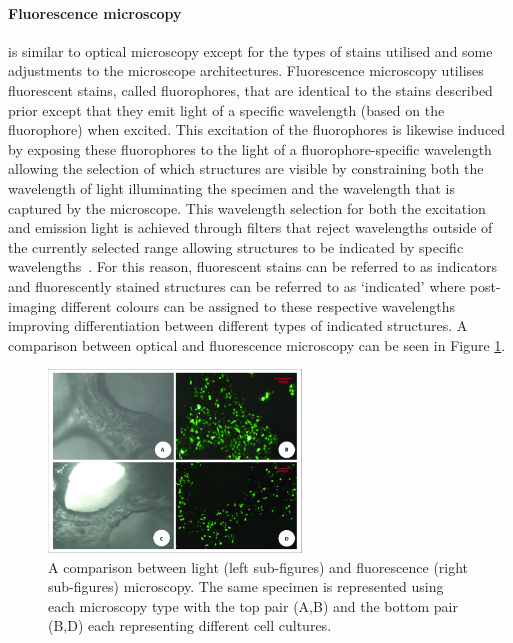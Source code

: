 \paragraph{Fluorescence microscopy} is similar to optical microscopy except for the types of stains utilised and some adjustments to the microscope architectures. Fluorescence microscopy utilises fluorescent stains, called fluorophores, that are identical to the stains described prior except that they emit light of a specific wavelength (based on the fluorophore) when excited. This excitation of the fluorophores is likewise induced by exposing these fluorophores to the light of a fluorophore-specific wavelength allowing the selection of which structures are visible by constraining both the wavelength of light illuminating the specimen and the wavelength that is captured by the microscope. This wavelength selection for both the excitation and emission light is achieved through filters that reject wavelengths outside of the currently selected range allowing structures to be indicated by specific wavelengths~\cite{Sanderson-2014}. For this reason, fluorescent stains can be referred to as indicators and fluorescently stained structures can be referred to as `indicated' where post-imaging different colours can be assigned to these respective wavelengths improving differentiation between different types of indicated structures. A comparison between optical and fluorescence microscopy can be seen in Figure \ref{fig:microscopeTypeCompare}.

\begin{figure}[h]
    \centering
    \includegraphics[width=0.6\textwidth]{figs/Light-microscope-and-fluorescence-microscope-observation-of-DBM-scaffolds-under-dynamic.png}
    \caption[Visual comparison between light and fluorescence microscopy]{A comparison between light (left sub-figures) and fluorescence (right sub-figures) microscopy. The same specimen is represented using each microscopy type with the top pair (A,B) and the bottom pair (B,D) each representing different cell cultures\cite{microscopeTypeFig}.}
    \label{fig:microscopeTypeCompare}
\end{figure}

